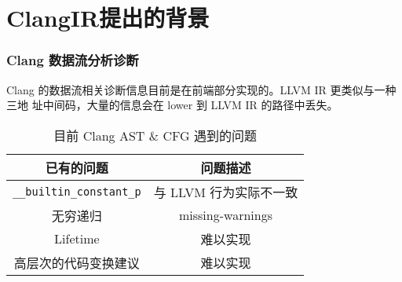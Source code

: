 \section{ClangIR提出的背景}

\begin{frame}
    \frametitle{Clang 数据流分析诊断}

    Clang 的数据流相关诊断信息目前是在前端部分实现的。LLVM IR 更类似与一种三地
    址中间码，大量的信息会在 lower 到 LLVM IR 的路径中丢失。

    \begin{table}
        \centering
        \begin{tabular}{cc}
            \toprule
            已有的问题                             & 问题描述                                             \\
            \midrule
            \texttt{\_\_builtin\_constant\_p} & 与 LLVM 行为实际不一致\cite{aaronballman-constantp-2019} \\
            无穷递归                              & missing-warnings\cite{aaronballman-infrec-2019}  \\
            Lifetime                          & 难以实现                                             \\
            高层次的代码变换建议                        & 难以实现                                             \\
            \bottomrule
        \end{tabular}
        \caption{目前 Clang AST \& CFG 遇到的问题}
    \end{table}
    \label{tab:clang_diag}
\end{frame}
